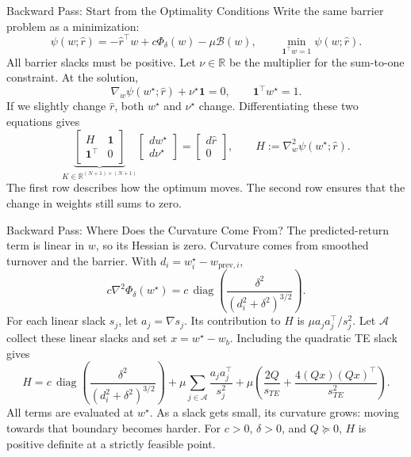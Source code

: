 \documentclass[aspectratio=169,xcolor=dvipsnames]{beamer}
\begin{document}
\begin{frame}{Backward Pass: Start from the Optimality Conditions}
    \small
    Write the same barrier problem as a minimization:
    \[
    \psi(w;\hat r)=-\hat r^\top w+c\Phi_\delta(w)-\mu\mathcal B(w),
    \qquad \min_{\mathbf1^\top w=1}\psi(w;\hat r).
    \]
    All barrier slacks must be positive. Let $\nu\in\mathbb R$ be the
    multiplier for the sum-to-one constraint. At the solution,
    \[
    \nabla_w\psi(w^\star;\hat r)+\nu^\star\mathbf1=0,
    \qquad \mathbf1^\top w^\star=1.
    \]
    If we slightly change $\hat r$, both $w^\star$ and $\nu^\star$ change.
    Differentiating these two equations gives
    \[
    \underbrace{\begin{bmatrix}H&\mathbf1\\\mathbf1^\top&0\end{bmatrix}}_{K\in\mathbb R^{(N+1)\times(N+1)}}
    \begin{bmatrix}dw^\star\\d\nu^\star\end{bmatrix}
    =\begin{bmatrix}d\hat r\\0\end{bmatrix},
    \qquad H:=\nabla_w^2\psi(w^\star;\hat r).
    \]
    The first row describes how the optimum moves. The second row ensures
    that the change in weights still sums to zero.
\end{frame}

\begin{frame}{Backward Pass: Where Does the Curvature Come From?}
    \small
    The predicted-return term is linear in $w$, so its Hessian is zero.
    Curvature comes from smoothed turnover and the barrier.
    With $d_i=w_i^\star-w_{\mathrm{prev},i}$,
    \[
    c\nabla^2\Phi_\delta(w^\star)
    =c\,\operatorname{diag}\!\left(
    \frac{\delta^2}{(d_i^2+\delta^2)^{3/2}}\right).
    \]
    For each linear slack $s_j$, let $a_j=\nabla s_j$.
    Its contribution to $H$ is $\mu a_ja_j^\top/s_j^2$.
    Let $\mathcal A$ collect these linear slacks and set $x=w^\star-w_b$.
    Including the quadratic TE slack gives
    \[
    \boxed{H=
    c\,\operatorname{diag}\!\left(\frac{\delta^2}{(d_i^2+\delta^2)^{3/2}}\right)
    +\mu\sum_{j\in\mathcal A}\frac{a_ja_j^\top}{s_j^2}
    +\mu\left(\frac{2Q}{s_{TE}}
    +\frac{4(Qx)(Qx)^\top}{s_{TE}^2}\right).}
    \]
    All terms are evaluated at $w^\star$. As a slack gets small, its
    curvature grows: moving towards that boundary becomes harder.
    For $c>0$, $\delta>0$, and $Q\succeq0$, $H$ is positive definite
    at a strictly feasible point.
\end{frame}
\end{document}

